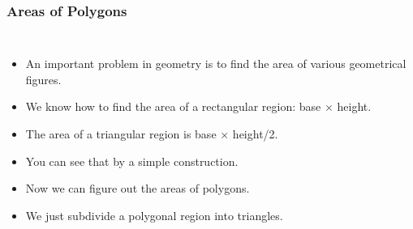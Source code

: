 \documentclass[serif,ignorenonframetext]{beamer}
\begin{document}
\begin{frame}
  \frametitle{Areas of Polygons}
  \begin{columns}
  \begin{itemize}[<+->]
  \item An important problem in geometry is to find the area of various
    geometrical figures.
  \item We know how to find the area of a rectangular region: 
    base $\times$ height.
  \item The area of a triangular region is base $\times$ height/2.
  \item You can see that by a simple construction.
  \item Now we can figure out the areas of polygons.
  \item We just subdivide a polygonal region into triangles.
  \end{itemize}
  \end{columns}
\end{frame}
\end{document}
